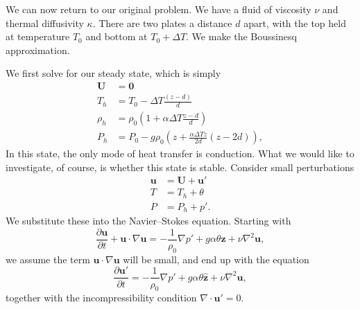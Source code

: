 \documentclass[a4paper]{article}
\begin{document}
We can now return to our original problem. We have a fluid of viscosity $\nu$ and thermal diffusivity $\kappa$. There are two plates a distance $d$ apart, with the top held at temperature $T_0$ and bottom at $T_0 + \Delta T$. We make the Boussinesq approximation.
\begin{center}
\end{center}
We first solve for our steady state, which is simply
\begin{align*}
  \mathbf{U} &= \mathbf{0}\\
 T_h &= T_0 - \Delta T \frac{(z - d)}{d}\\
 \rho_h &= \rho_0 \left(1 + \alpha \Delta T \frac{z - d}{d}\right)\\
 P_h &= P_0 - g \rho_0 \left(z + \frac{\alpha \Delta Tz}{2d}(z - 2d)\right),
\end{align*}
In this state, the only mode of heat transfer is conduction. What we would like to investigate, of course, is whether this state is stable. Consider small perturbations
\begin{align*}
  \mathbf{u} &= \mathbf{U} + \mathbf{u}'\\
  T &= T_h + \theta\\
  P &= P_h + p'.
\end{align*}
We substitute these into the Navier--Stokes equation. Starting with
\[
  \frac{\partial \mathbf{u}}{\partial t} + \mathbf{u} \cdot \nabla \mathbf{u} = -\frac{1}{\rho_0} \nabla p' + g \alpha \theta \hat{\mathbf{z}} + \nu \nabla^2 \mathbf{u},
\]
we assume the term $\mathbf{u} \cdot \nabla \mathbf{u}$ will be small, and end up with the equation
\[
  \frac{\partial \mathbf{u}'}{\partial t} = - \frac{1}{\rho_0} \nabla p' + g \alpha \theta \hat{\mathbf{z}} + \nu \nabla^2 \mathbf{u},
\]
together with the incompressibility condition $\nabla \cdot \mathbf{u}' = 0$.
\end{document}
